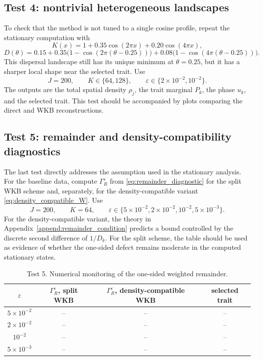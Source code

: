 \documentclass[11pt]{article}
\begin{document}
\subsection{Test 4: nontrivial heterogeneous landscapes}

To check that the method is not tuned to a single cosine profile, repeat the
stationary computation with
\begin{equation}\label{eq:numerical_KD_heterogeneous}
    K(x)=1+0.35\cos(2\pi x)+0.20\cos(4\pi x),
\end{equation}
\begin{equation}\label{eq:numerical_D_heterogeneous}
    D(\theta)
    =
    0.15
    +0.35\bigl(1-\cos(2\pi(\theta-0.25))\bigr)
    +0.08\bigl(1-\cos(4\pi(\theta-0.25))\bigr) .
\end{equation}
This dispersal landscape still has its unique minimum at \(\theta=0.25\), but
it has a sharper local shape near the selected trait. Use
\[
    J=200,
    \qquad
    K\in\{64,128\},
    \qquad
    \varepsilon\in\{2\times10^{-2},10^{-2}\} .
\]
The outputs are the total spatial density
\(\rho_j\), the trait marginal \(P_k\), the phase \(u_k\), and the selected
trait. This test should be accompanied by plots comparing the direct and WKB
reconstructions.

\subsection{Test 5: remainder and density-compatibility diagnostics}

The last test directly addresses the assumption used in the stationary
analysis. For the baseline data, compute \(\Gamma_R^\varepsilon\) from
\eqref{eq:remainder_diagnostic} for the split WKB scheme and, separately, for
the density-compatible variant \eqref{eq:density_compatible_W}. Use
\[
    J=200,
    \qquad
    K=64,
    \qquad
    \varepsilon\in
    \{5\times10^{-2},2\times10^{-2},10^{-2},5\times10^{-3}\} .
\]
For the density-compatible variant, the theory in
Appendix~\ref{append:remainder_condition} predicts a bound controlled by the
discrete second difference of \(1/D_k\). For the split scheme, the table should
be used as evidence of whether the one-sided defect remains moderate in the
computed stationary states.

\begin{table}[h]
\centering
\caption{Test 5. Numerical monitoring of the one-sided weighted remainder.}
\label{tab:test5_remainder}
\begin{tabular}{cccc}
\toprule
\(\varepsilon\) & \(\Gamma_R^\varepsilon\), split WKB & \(\Gamma_R^\varepsilon\), density-compatible WKB & selected trait \\
\midrule
\(5\times10^{-2}\) & -- & -- & -- \\
\(2\times10^{-2}\) & -- & -- & -- \\
\(10^{-2}\)        & -- & -- & -- \\
\(5\times10^{-3}\) & -- & -- & -- \\
\bottomrule
\end{tabular}
\end{table}
\end{document}

